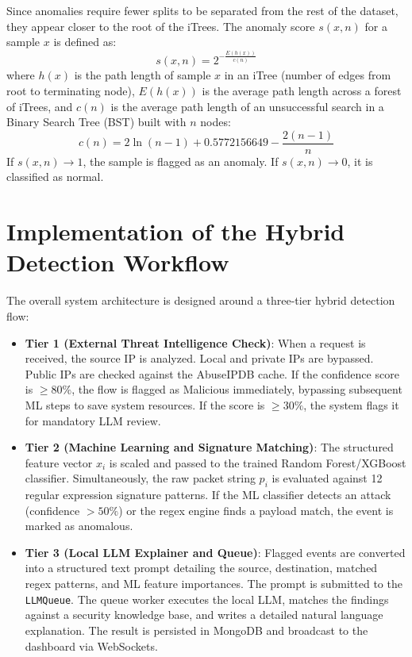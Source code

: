 \documentclass[12pt,a4paper]{report}
\begin{document}
Since anomalies require fewer splits to be separated from the rest of the dataset, they appear closer to the root of the iTrees. The anomaly score $s(x, n)$ for a sample $x$ is defined as:
\begin{equation}
  s(x, n) = 2^{-\frac{E(h(x))}{c(n)}}
\end{equation}
where $h(x)$ is the path length of sample $x$ in an iTree (number of edges from root to terminating node), $E(h(x))$ is the average path length across a forest of iTrees, and $c(n)$ is the average path length of an unsuccessful search in a Binary Search Tree (BST) built with $n$ nodes:
\begin{equation}
  c(n) = 2 \ln(n - 1) + 0.5772156649 - \frac{2(n - 1)}{n}
\end{equation}
If $s(x, n) \to 1$, the sample is flagged as an anomaly. If $s(x, n) \to 0$, it is classified as normal.

\section{Implementation of the Hybrid Detection Workflow}

The overall system architecture is designed around a three-tier hybrid detection flow:
\begin{itemize}[leftmargin=1.5em]
  \item \textbf{Tier 1 (External Threat Intelligence Check)}: When a request is received, the source IP is analyzed. Local and private IPs are bypassed. Public IPs are checked against the AbuseIPDB cache. If the confidence score is $\ge 80\%$, the flow is flagged as Malicious immediately, bypassing subsequent ML steps to save system resources. If the score is $\ge 30\%$, the system flags it for mandatory LLM review.
  \item \textbf{Tier 2 (Machine Learning and Signature Matching)}: The structured feature vector $x_i$ is scaled and passed to the trained Random Forest/XGBoost classifier. Simultaneously, the raw packet string $p_i$ is evaluated against 12 regular expression signature patterns. If the ML classifier detects an attack (confidence $> 50\%$) or the regex engine finds a payload match, the event is marked as anomalous.
  \item \textbf{Tier 3 (Local LLM Explainer and Queue)}: Flagged events are converted into a structured text prompt detailing the source, destination, matched regex patterns, and ML feature importances. The prompt is submitted to the \texttt{LLMQueue}. The queue worker executes the local LLM, matches the findings against a security knowledge base, and writes a detailed natural language explanation. The result is persisted in MongoDB and broadcast to the dashboard via WebSockets.
\end{itemize}
\end{document}
